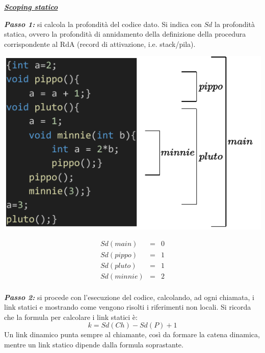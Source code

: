 \documentclass[a4paper]{article}
\begin{document}
	\begin{center}
		\textbf{\emph{\underline{Scoping statico}}}
	\end{center}
	\textbf{\emph{Passo 1:}} si calcola la profondità del codice dato. Si indica con $Sd$ la profondità statica, ovvero la profondità di annidamento della definizione della procedura corrispondente al RdA (record di attivazione, i.e. stack/pila).\newline
	
	\noindent
	\begin{minipage}{.7\textwidth}
		\begin{center}
			\includegraphics[width=\textwidth]{img/ex3-1.pdf}
		\end{center}
	\end{minipage}
	\begin{minipage}{.3\textwidth}
		\begin{equation*}
			\begin{array}{rcl}
				Sd\left(main\right) &=& 0 \\
				Sd\left(pippo\right) &=& 1 \\
				Sd\left(pluto\right) &=& 1 \\
				Sd\left(minnie\right) &=& 2 \\
			\end{array}
		\end{equation*}
	\end{minipage}\newline
	
	\noindent
	\textbf{\emph{Passo 2:}} si procede con l'esecuzione del codice, calcolando, ad ogni chiamata, i link statici e mostrando come vengono risolti i riferimenti non locali. Si ricorda che la formula per calcolare i link statici è:
	\begin{equation*}
		k = Sd(Ch) - Sd(P) + 1
	\end{equation*}
	Un link dinamico punta sempre al chiamante, così da formare la catena dinamica, mentre un link statico dipende dalla formula soprastante.
	
\end{document}

